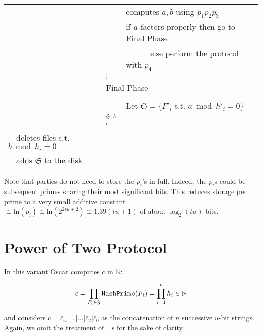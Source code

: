 \documentclass[11pt]{llncs}
\begin{document}
\begin{center}
\begin{tabular}{lcl}
                                   &                                                      &computes $a,b$ using $p_1 p_2 p_3$~\\
                                   &                                                      &if $a$ factors properly then go to {\sf Final Phase}\\
                                   &                                                      &~~~~~~else perform the protocol with $p_4$ ~~\\
                                   &                  $\vdots$
& \\\midrule
\multicolumn{3}{c}{{\sf Final Phase~~}} \\\midrule
                                   &                                                      & \\
                                   &                                                      &Let $\mathfrak{S}=\{F'_i \mbox{~s.t.~} a \bmod h'_i =0\}$~~\\
                                   &~~{\LARGE $\stackrel{\mathfrak{S},b}{\longleftarrow}$}&\\
                                   ~~deletes files s.t. $b \bmod h_i =0$&                                                      &\\
                                   ~~adds $\mathfrak{S}$ to the disk
                                   &
                                   &\\\bottomrule
\end{tabular}
\end{center}

Note that parties do not need to store the $p_i$'s in full. Indeed, the $p_i$s could be subsequent primes sharing their most significant bits. This reduces storage per prime to a very small additive constant $ \cong \mbox{ln}(p_i) \cong \mbox{ln}(2^{2tu+2}) \cong 1.39(tu+1)$ of about $\log_2(tu)$ bits.

\section{Power of Two Protocol}
\label{powtwo}

In this variant Oscar computes $c$ in $\mathbb{N}$:

$$
c=\prod_{F_i\in \mathfrak{F}} \mbox{{\tt HashPrime}}(F_i) = \prod_{i=1}^n h_i \in \mathbb{N}
$$

and considers $c=\bar{c}_{n-1}|\ldots|\bar{c}_2|\bar{c}_0$ as the concatenation of $n$ successive $u$-bit strings. Again, we omit the treatment of $\bot$s for the sake of clarity.
\end{document}
